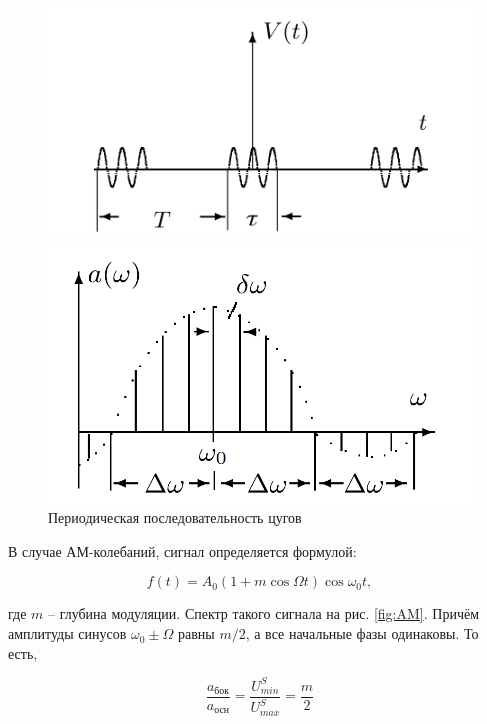 \documentclass[12pt,a4paper]{article}
\begin{document}
\begin{figure}[h]
	\begin{minipage}{0.49\linewidth}
		\centering
		\includegraphics[width=0.9\linewidth]{"res/zug"}
	\end{minipage}
	\begin{minipage}{0.49\linewidth}
		\centering
		\includegraphics[width=0.9\linewidth]{"res/spzug"}
	\end{minipage}
	\caption{Периодическая последовательность цугов}
	\label{fig:zug}
\end{figure}

В случае АМ-колебаний, сигнал определяется формулой:

\begin{equation}\label{key}
	f(t) = A_0 \left(1+m \cos \Omega t \right) \cos \omega_0 t,
\end{equation}

где $ m $ -- глубина модуляции.
Спектр такого сигнала на рис. \ref{fig:AM}. Причём амплитуды синусов $ \omega_0 \pm \Omega $ равны $ m/2 $, а все начальные фазы одинаковы. То есть,

\begin{equation}
	\frac{a_\text{бок}}{a_\text{осн}} = \frac{U_{min}^S}{U_{max}^S} = \frac{m}{2}
	\label{eq:new}
\end{equation} 
\end{document}
